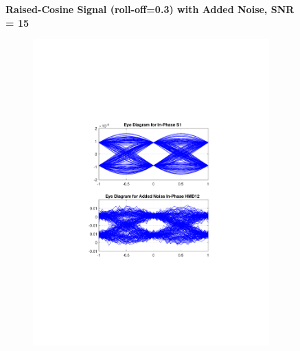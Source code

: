 \begin{refsection}
\begin{table}[H]
\begin{tabular}{|l|l|}
	\end{tabular}
\end{table}
\begin{figure}[H]
		\centering
	\textbf{Raised-Cosine Signal (roll-off=0.3) with Added Noise, SNR = 15}
	\begin{minipage}{\linewidth}
		\centering
	\begin{subfigure}{.45\textwidth}
		\centering
		\includegraphics[clip, trim=5cm 7cm 5cm 7cm, width=\textwidth]{./sdf/m_qam_system/figures/eyes/if_n_nmf_45_60_rc.pdf}
	\end{subfigure}
	\begin{subfigure}{.45\textwidth}
		\centering

\end{subfigure}
\end{minipage}
\end{figure}
\end{refsection}

